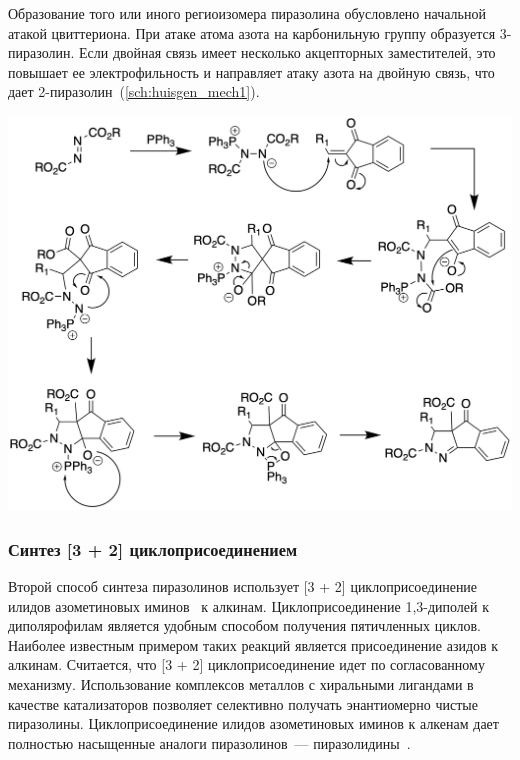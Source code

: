 Образование того или иного региоизомера пиразолина обусловлено начальной атакой цвиттериона.
При атаке атома азота на карбонильную группу образуется 3-пиразолин.
Если двойная связь имеет несколько акцепторных заместителей, это повышает ее электрофильность и направляет атаку азота на двойную связь, что дает 2-пиразолин~(\ref{sch:huisgen_mech1}).


\begin{scheme}[h!]
    \centering
    \includegraphics{sections/literature/img/huisgen_mech1.png}
    \caption{}
    \label{sch:huisgen_mech1}
\end{scheme}

\FloatBarrier{}

\subsubsection{Синтез [3 + 2] циклоприсоединением}

Второй способ синтеза пиразолинов использует [3 + 2] циклоприсоединение илидов азометиновых иминов~\textbf{} к алкинам. Циклоприсоединение 1,3-диполей к диполярофилам является удобным способом получения пятичленных циклов. Наиболее известным примером таких реакций является присоединение азидов к алкинам. Считается, что [3 + 2] циклоприсоединение идет по согласованному механизму. Использование комплексов металлов с хиральными лигандами в качестве катализаторов позволяет селективно получать энантиомерно чистые пиразолины. Циклоприсоединение илидов азометиновых иминов к алкенам дает полностью насыщенные аналоги пиразолинов~--- пиразолидины~\cite{Groselj2018}.

